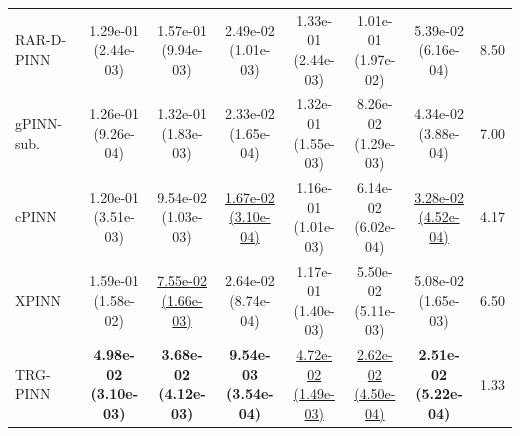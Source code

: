 \begin{table}[t]
\begin{tabular}{lccccccc}
RAR-D-PINN & \shortstack{1.29e-01\\(2.44e-03)} & \shortstack{1.57e-01\\(9.94e-03)} & \shortstack{2.49e-02\\(1.01e-03)} & \shortstack{1.33e-01\\(2.44e-03)} & \shortstack{1.01e-01\\(1.97e-02)} & \shortstack{5.39e-02\\(6.16e-04)} & 8.50 \\
gPINN-sub. & \shortstack{1.26e-01\\(9.26e-04)} & \shortstack{1.32e-01\\(1.83e-03)} & \shortstack{2.33e-02\\(1.65e-04)} & \shortstack{1.32e-01\\(1.55e-03)} & \shortstack{8.26e-02\\(1.29e-03)} & \shortstack{4.34e-02\\(3.88e-04)} & 7.00 \\
cPINN & \shortstack{1.20e-01\\(3.51e-03)} & \shortstack{9.54e-02\\(1.03e-03)} & \shortstack{\underline{1.67e-02}\\\underline{(3.10e-04)}} & \shortstack{1.16e-01\\(1.01e-03)} & \shortstack{6.14e-02\\(6.02e-04)} & \shortstack{\underline{3.28e-02}\\\underline{(4.52e-04)}} & 4.17 \\
XPINN & \shortstack{1.59e-01\\(1.58e-02)} & \shortstack{\underline{7.55e-02}\\\underline{(1.66e-03)}} & \shortstack{2.64e-02\\(8.74e-04)} & \shortstack{1.17e-01\\(1.40e-03)} & \shortstack{5.50e-02\\(5.11e-03)} & \shortstack{5.08e-02\\(1.65e-03)} & 6.50 \\
TRG-PINN & \shortstack{\textbf{4.98e-02}\\\textbf{(3.10e-03)}} & \shortstack{\textbf{3.68e-02}\\\textbf{(4.12e-03)}} & \shortstack{\textbf{9.54e-03}\\\textbf{(3.54e-04)}} & \shortstack{\underline{4.72e-02}\\\underline{(1.49e-03)}} & \shortstack{\underline{2.62e-02}\\\underline{(4.50e-04)}} & \shortstack{\textbf{2.51e-02}\\\textbf{(5.22e-04)}} & 1.33 \\
\bottomrule
\end{tabular}
\end{table}
